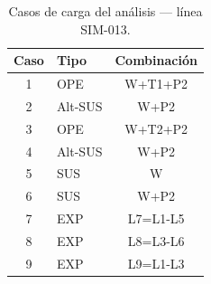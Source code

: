 \begin{table}[htbp]
  \centering
  \small
  \caption{Casos de carga del análisis — línea SIM-013.}
  \label{tab:casos}
  \begin{tabular}{clc}
    \toprule
    Caso & Tipo & Combinaci\'on \\
    \midrule
    1 & OPE & W+T1+P2 \\
    2 & Alt-SUS & W+P2 \\
    3 & OPE & W+T2+P2 \\
    4 & Alt-SUS & W+P2 \\
    5 & SUS & W \\
    6 & SUS & W+P2 \\
    7 & EXP & L7=L1-L5 \\
    8 & EXP & L8=L3-L6 \\
    9 & EXP & L9=L1-L3 \\
    \bottomrule
  \end{tabular}
\end{table}
